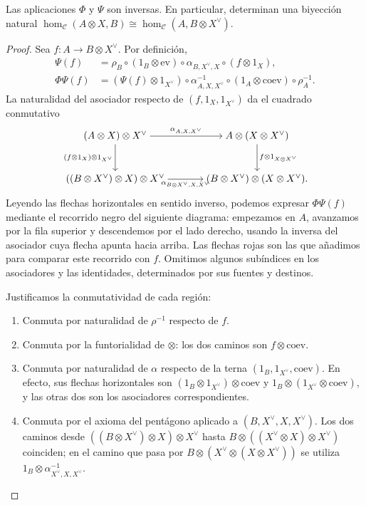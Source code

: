 \begin{prop}\label{prop:adjuncion}
Las aplicaciones $\Phi$ y $\Psi$ son inversas. En particular, determinan una biyección natural $\hom_{\mathcal C}(A\otimes X,B)\cong\hom_{\mathcal C}(A,B\otimes X^\vee)$.
\end{prop}
\begin{proof}
Sea $f\colon A\to B\otimes X^\vee$. Por definición,
\[
\begin{aligned}
\Psi(f)&=\rho_B\circ(1_B\otimes\mathrm{ev})\circ\alpha_{B,X^\vee,X}\circ(f\otimes1_X),\\
\Phi\Psi(f)&=(\Psi(f)\otimes1_{X^\vee})\circ\alpha^{-1}_{A,X,X^\vee}
\circ(1_A\otimes\mathrm{coev})\circ\rho_A^{-1}.
\end{aligned}
\]
La naturalidad del asociador respecto de $(f,1_X,1_{X^\vee})$ da el cuadrado conmutativo
\[
\begin{tikzcd}[column sep=large,row sep=large,cramped]
(A\otimes X)\otimes X^\vee
    \arrow[r,"\alpha_{A,X,X^\vee}"]
    \arrow[d,"(f\otimes1_X)\otimes1_{X^\vee}"']
& A\otimes(X\otimes X^\vee)
    \arrow[d,"f\otimes1_{X\otimes X^\vee}"]\\
((B\otimes X^\vee)\otimes X)\otimes X^\vee
    \arrow[r,"\alpha_{B\otimes X^\vee,X,X^\vee}"']
& (B\otimes X^\vee)\otimes(X\otimes X^\vee).
\end{tikzcd}
\]
Leyendo las flechas horizontales en sentido inverso, podemos expresar $\Phi\Psi(f)$ mediante el recorrido negro del siguiente diagrama: empezamos en $A$, avanzamos por la fila superior y descendemos por el lado derecho, usando la inversa del asociador cuya flecha apunta hacia arriba. Las flechas rojas son las que añadimos para comparar este recorrido con $f$. Omitimos algunos subíndices en los asociadores y las identidades, determinados por sus fuentes y destinos.

Justificamos la conmutatividad de cada región:
\begin{enumerate}[label=(\roman*)]
\item Conmuta por naturalidad de $\rho^{-1}$ respecto de $f$.
\item Conmuta por la funtorialidad de $\otimes$: los dos caminos son $f\otimes\mathrm{coev}$.
\item Conmuta por naturalidad de $\alpha$ respecto de la terna $(1_B,1_{X^\vee},\mathrm{coev})$. En efecto, sus flechas horizontales son $(1_B\otimes1_{X^\vee})\otimes\mathrm{coev}$ y $1_B\otimes(1_{X^\vee}\otimes\mathrm{coev})$, y las otras dos son los asociadores correspondientes.
\item Conmuta por el axioma del pentágono aplicado a $(B,X^\vee,X,X^\vee)$. Los dos caminos desde $((B\otimes X^\vee)\otimes X)\otimes X^\vee$ hasta $B\otimes((X^\vee\otimes X)\otimes X^\vee)$ coinciden; en el camino que pasa por $B\otimes(X^\vee\otimes(X\otimes X^\vee))$ se utiliza $1_B\otimes\alpha^{-1}_{X^\vee,X,X^\vee}$.

\end{enumerate}
\end{proof}
